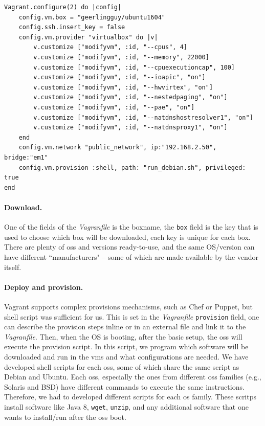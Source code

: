 \begin{lstlisting}[style=mystyle,caption=Ubuntu 16.04 Vagrantfile,label=vagrantfile]
Vagrant.configure(2) do |config|
	config.vm.box = "geerlingguy/ubuntu1604"
	config.ssh.insert_key = false
	config.vm.provider "virtualbox" do |v|
		v.customize ["modifyvm", :id, "--cpus", 4]
		v.customize ["modifyvm", :id, "--memory", 22000]
		v.customize ["modifyvm", :id, "--cpuexecutioncap", 100]
		v.customize ["modifyvm", :id, "--ioapic", "on"]
		v.customize ["modifyvm", :id, "--hwvirtex", "on"]
		v.customize ["modifyvm", :id, "--nestedpaging", "on"]
		v.customize ["modifyvm", :id, "--pae", "on"]
		v.customize ["modifyvm", :id, "--natdnshostresolver1", "on"]
		v.customize ["modifyvm", :id, "--natdnsproxy1", "on"]
	end
	config.vm.network "public_network", ip:"192.168.2.50", bridge:"em1"
	config.vm.provision :shell, path: "run_debian.sh", privileged: true
end
\end{lstlisting}


\paragraph{Download.}
One of the fields of the \emph{Vagranfile} is the boxname, the \texttt{box} field is the key that is used to choose which box will be downloaded, each key is unique for each box.
There are plenty of \glspl{os} and versions ready-to-use, and the same OS/version can have different ``manufacturers" -- some of which are made available by the vendor itself.

\paragraph{Deploy and provision.}
Vagrant supports complex provisions mechanisms, such as Chef or Puppet, but shell script was sufficient for us. 
This is set in the \emph{Vagranfile} \texttt{provision} field, one can describe the provision steps inline or in an external file and link it to the \emph{Vagranfile}.
Then, when the OS is booting, after the basic setup, the \glspl{os} will execute the provision script.
In this script, we program which software will be downloaded and run in the \glspl{vm} and what configurations are needed. 
We have developed shell scripts for each \glspl{os}, some of which share the same script as Debian and Ubuntu. 
Each \glspl{os}, especially the ones from different \glspl{os} families (e.g., Solaris and BSD) have different commands to execute the same instructions.
Therefore, we had to developed different scripts for each \gls{os} family. 
These scritps install software like Java 8, \texttt{wget}, \texttt{unzip}, and any additional software that one wants to install/run after the \glspl{os} boot.




